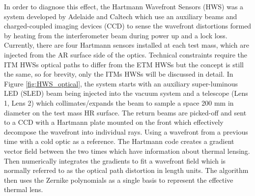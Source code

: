 	In order to diagnose this effect, the Hartmann Wavefront Sensors (HWS) \cite{Brooks_OffAxis} \cite{Veitch_HWS_ALIGO} was a system developed by Adelaide and Caltech \cite{Brooks_HWS_2007} \cite{Brooks_HWS_2009} which use an auxiliary beams and charged-coupled imaging devices (CCD) to sense the wavefront distortions formed by heating from the interferometer beam during power up and a lock loss.  Currently, there are four Hartmann sensors installed at each test mass, which are injected from the AR surface side of the optics. Technical constraints require the ITM HWSs optical paths to differ from the ETM HWSs but the concept is still the same, so for brevity, only the ITMs HWSs will be discussed in detail.  In Figure \ref{fig:HWS_optical}, the system starts with an auxiliary super-luminous LED (SLED) beam being injected into the vacuum system and a telescope (Lens 1, Lens 2) which collimates/expands the beam to sample a space 200 mm in diameter on the test mass HR surface.  The return beams are picked-off and sent to a CCD with a Hartmann plate mounted on the front which effectively decompose the wavefront into individual rays.  Using a wavefront from a previous time with a cold optic as a reference. The Hartmann code creates a gradient vector field between the two times which have information about thermal lensing. Then numerically integrates the gradients to fit a wavefront field which is normally referred to as the optical path distortion in length units.  The algorithm then uses the Zernike polynomials as a single basis to represent the effective thermal lens. \cite{Brooks_thesis}
	
